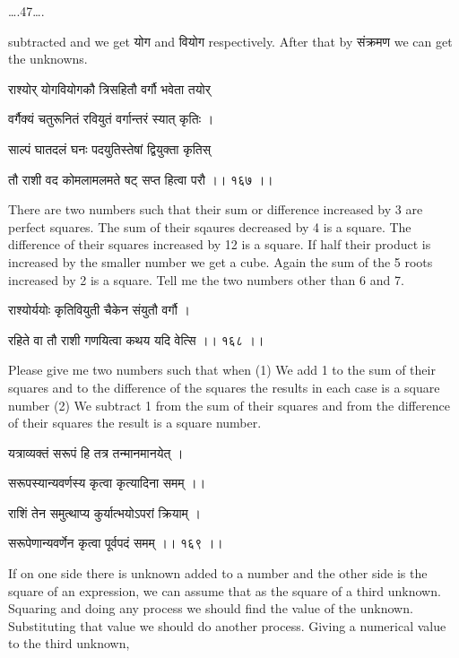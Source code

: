 \documentclass[]{article}
\date{}
\begin{document}
{\ldots{}.47\ldots{}.}

{subtracted and we get योग and वियोग respectively. After that by संक्रमण
we can get the unknowns.}

{राश्योर् योगवियोगकौ त्रिसहितौ वर्गौ भवेता तयोर् }

{वर्गैक्यं चतुरूनितं रवियुतं वर्गान्तरं स्यात् कृतिः । }

{साल्पं घातदलं घनः पदयुतिस्तेषां द्वियुक्ता कृतिस् }

{तौ राशी वद कोमलामलमते षट् सप्त हित्वा परौ ।। १६७ ।। }

{There are two numbers such that their sum or difference increased by 3
are perfect squares. The sum of their sqaures decreased by 4 is a
square. The difference of their squares increased by 12 is a square. If
half their product is increased by the smaller number we get a cube.
Again the sum of the 5 roots increased by 2 is a square. Tell me the two
numbers other than 6 and 7.}

{राश्योर्ययोः कृतिवियुती चैकेन संयुतौ वर्गौ । }

{रहिते वा तौ राशी गणयित्वा कथय यदि वेत्सि ।। १६८ ।।}{ }

{Please give me two numbers such that when (1) We add 1 to the sum of
their squares and to the difference of the squares the results in each
case is a square number (2) We subtract 1 from the sum of their squares
and from the difference of their squares the result is a square number.}

{यत्राव्यक्तं सरूपं हि तत्र तन्मानमानयेत् । }

{सरूपस्यान्यवर्णस्य कृत्वा कृत्यादिना समम् ।। }

{राशिं तेन समुत्थाप्य कुर्यात्भयोऽपरां क्रियाम् । }

{सरूपेणान्यवर्णेन कृत्वा पूर्वपदं समम् ।। १६९ ।। }

{If on one side there is unknown added to a number and the other side is
the square of an expression, we can assume that as the square of a third
unknown. Squaring and doing any process we should find the value of the
unknown. Substituting that value we should do another process. Giving a
numerical value to the third unknown,}
\end{document}
